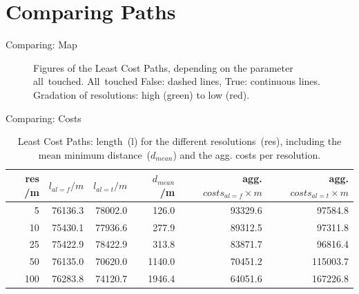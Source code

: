 \documentclass[usenames,dvipsnames,aspectratio=169]{beamer}
\begin{document}
	\section{Comparing Paths}
	\begin{frame}{Comparing: Map}
		\begin{figure}
			\centering
			
			\qquad
			
			\caption{Figures of the Least Cost Paths, depending on the parameter all~touched. All~touched False: dashed lines, True: continuous lines. Gradation of resolutions: high (green) to low (red).}
			\label{fig:pathsAllTouched}
		\end{figure}
	\end{frame}

	\begin{frame}{Comparing: Costs}
		\begin{table}[t]
			\caption{Least Cost Paths: length~(l) for the different resolutions~(res), including the mean minimum distance~($d_{mean}$) and the agg. costs per resolution.} 
			\label{tab:2}
			\centering
			\begin{tabular}{ r  r  r  r  r  r   }
				res /m & $l_{al=f} /m$ & $l_{al=t} /m$ & $d_{mean}$ /m  & agg. $costs_{al=f} \times m$ & agg. $costs_{al=t} \times m$ \\
				\hline
				5 	& 76136.3	& 78002.0 &  126.0  & 93329.6 &  97584.8 \\
				10 	& 75430.1 	& 77936.6 &  277.9  & 89312.5 &  97311.8 \\
				25 	& 75422.9 	& 78422.9 &  313.8  & 83871.7 &  96816.4 \\
				50 	& 76135.0	& 70620.0 & 1140.0  & 70451.2 & 115003.7 \\
				100 & 76283.8	& 74120.7 & 1946.4  & 64051.6 & 167226.8 \\
			\end{tabular}
		\end{table}
	\end{frame}
\end{document}
